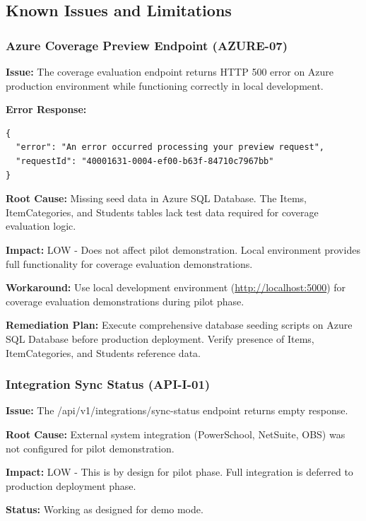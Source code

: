 \subsection{Known Issues and Limitations}

\subsubsection{Azure Coverage Preview Endpoint (AZURE-07)}

\textbf{Issue:} The coverage evaluation endpoint returns HTTP 500 error on Azure production environment while functioning correctly in local development.

\textbf{Error Response:}
\begin{verbatim}
{
  "error": "An error occurred processing your preview request",
  "requestId": "40001631-0004-ef00-b63f-84710c7967bb"
}
\end{verbatim}

\textbf{Root Cause:} Missing seed data in Azure SQL Database. The Items, ItemCategories, and Students tables lack test data required for coverage evaluation logic.

\textbf{Impact:} LOW - Does not affect pilot demonstration. Local environment provides full functionality for coverage evaluation demonstrations.

\textbf{Workaround:} Use local development environment (\url{http://localhost:5000}) for coverage evaluation demonstrations during pilot phase.

\textbf{Remediation Plan:} Execute comprehensive database seeding scripts on Azure SQL Database before production deployment. Verify presence of Items, ItemCategories, and Students reference data.

\subsubsection{Integration Sync Status (API-I-01)}

\textbf{Issue:} The /api/v1/integrations/sync-status endpoint returns empty response.

\textbf{Root Cause:} External system integration (PowerSchool, NetSuite, OBS) was not configured for pilot demonstration.

\textbf{Impact:} LOW - This is by design for pilot phase. Full integration is deferred to production deployment phase.

\textbf{Status:} Working as designed for demo mode.

